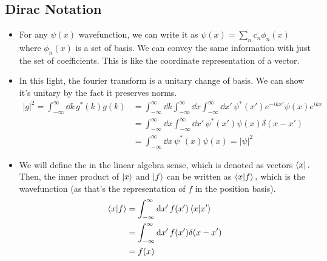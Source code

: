\documentclass[12pt]{article}
\begin{document}
\subsection{Dirac Notation}
\begin{itemize}
    \item For any $\psi(x)$ wavefunction, we can write it as $\psi(x)=\sum_n c_n\phi_n(x)$ where $\phi_n(x)$ is a set of basis. We can convey the same information with just the set of coefficients. This is like the coordinate representation of a vector.
    \item In this light, the fourier transform is a unitary change of basis. We can show it's unitary by the fact it preserves norms.
    \begin{align}
        |g|^2=\int_{-\infty}^\infty\dd k\,g^*(k)g(k)&=\int_{-\infty}^\infty\dd k\int_{-\infty}^\infty\dd x\int_{-\infty}^\infty\dd x'\,\psi^*(x')e^{-ikx'}\psi(x)e^{ikx}\\
        &=\int_{-\infty}^\infty\dd x\int_{-\infty}^\infty\dd x'\,\psi^*(x')\psi(x)\delta(x-x')\\
        &=\int_{-\infty}^\infty\dd x\,\psi^*(x)\psi(x)=|\psi|^2
    \end{align}
    \item We will define the  in the linear algebra sense, which is denoted as  vectors $\bra x.$ Then, the inner product of $\ket x$ and $\ket f$ can be written as $\braket{x}{f},$ which is the wavefunction (as that's the representation of $f$ in the position basis).
    \begin{align}
        \braket{x}{f}&=\int_{-\infty}^\infty\dd x'\,f(x')\braket{x}{x'}\\
        &=\int_{-\infty}^\infty\dd x'\,f(x')\delta(x-x')\\
        &=f(x)
    \end{align}
\end{itemize}
\end{document}
